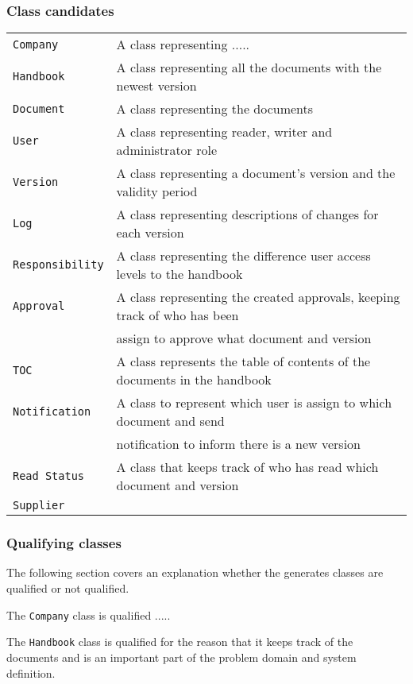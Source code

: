 \subsubsection{Class candidates}
\begin{tabular}{l l}
 \texttt{Company} & A class representing ..... \\
  \texttt{Handbook} & A class representing all the documents with the newest version\\
  \texttt{Document} & A class representing the documents\\ %
  \texttt{User }& A class representing reader, writer and administrator role\\
 \texttt{Version} & A class representing a document’s version and the validity period\\
  \texttt{Log} & A class representing descriptions of changes for each version\\
  \texttt{Responsibility} & A class representing the difference user access levels to the handbook\\
 \texttt{Approval} & A class representing the created approvals, keeping track of who has been\\&assign to approve what document and version\\  %
  \texttt{TOC} & A class represents the table of contents of the documents in the handbook\\
  \texttt{Notification} & A class to represent which user is assign to which document and send\\&notification to inform there is a new version\\
  \texttt{Read Status} & A class that keeps track of who has read which document and version\\
  \texttt{Supplier} & 
\end{tabular}

\subsubsection{Qualifying classes}
The following section covers an explanation whether the generates classes are qualified or not qualified.

The \texttt{Company} class is qualified .....

The \texttt{Handbook} class is qualified for the reason that it keeps track of the documents and is an important part of the problem domain and system definition. 

